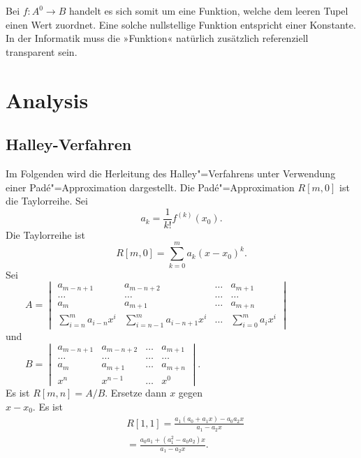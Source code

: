 \documentclass[a4paper,10pt,fleqn,twocolumn,twoside,dvipdfmx]{scrartcl}
\numberwithin{equation}{section}
\theoremstyle{rmbox}
\begin{document}
Bei $f\colon A^0\to B$ handelt es sich somit um eine Funktion, welche
dem leeren Tupel einen Wert zuordnet. Eine solche nullstellige
Funktion entspricht einer Konstante. In der Informatik muss die
»Funktion« natürlich zusätzlich referenziell transparent sein.

\section{Analysis}
\subsection{Halley-Verfahren}
Im Folgenden wird die Herleitung des Halley"=Verfahrens unter
Verwendung einer Padé"=Approximation dargestellt.
Die Padé"=Approximation $R[m,0]$ ist die Taylorreihe. Sei
\begin{equation}
a_k = \frac{1}{k!} f^{(k)}(x_0).
\end{equation}
Die Taylorreihe ist
\begin{equation}
R[m,0] = \sum_{k=0}^m a_k(x-x_0)^k.
\end{equation}
Sei\\
$\mbox{}\qquad A=\begin{vmatrix}
a_{m-n+1} & a_{m-n+2} & \ldots & a_{m+1}\\
\ldots & \ldots & \ldots & \ldots\\
a_m & a_{m+1} & \ldots & a_{m+n}\\
\sum\limits_{i=n}^m a_{i-n}x^i &
\sum\limits_{i=n-1}^m a_{i-n+1}x^i
&\ldots & \sum\limits_{i=0}^m a_i x^i
\end{vmatrix}$\\
und\\
$\mbox{}\qquad B=\begin{vmatrix}
a_{m-n+1} & a_{m-n+2} & \ldots & a_{m+1}\\
\ldots &\ldots &\ldots &\ldots\\
a_m & a_{m+1} &\ldots & a_{m+n}\\
x^n & x^{n-1} &\ldots & x^0
\end{vmatrix}$.\\
Es ist $R[m,n]=A/B$.
Ersetze dann $x$ gegen\\
$x-x_0$. Es ist
\begin{equation}
\begin{split}
& R[1,1] = \frac{a_1(a_0+a_1 x)-a_0a_2x}{a_1-a_2x}\\
& = \frac{a_0a_1+(a_1^2-a_0a_2)x}{a_1-a_2x}.
\end{split}
\end{equation}
\end{document}
